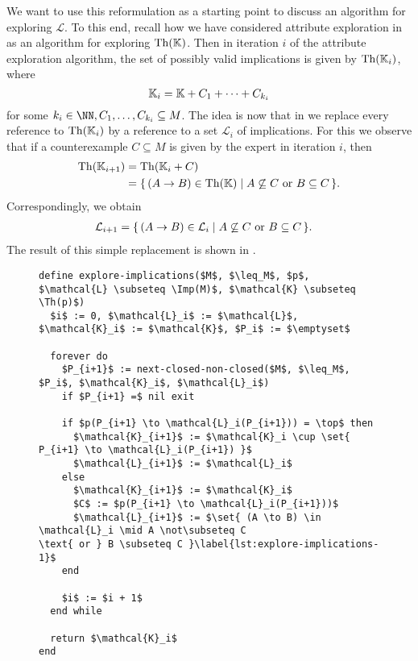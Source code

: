 We want to use this reformulation as a starting point to discuss an algorithm for
exploring $\mathcal{L}$.  To this end, recall how we have considered attribute exploration
in  as an algorithm for exploring $\operatorname{Th}({\mathbb{K}})$.  Then in
iteration $i$ of the attribute exploration algorithm, the set of possibly valid
implications is given by $\operatorname{Th}({\mathbb{K}}_{i})$, where
\begin{equation*}
  {\ensuremath{\mathbb{K}}}_{i} = {\mathbb{K}} + C_{1} + \dots + C_{k_{i}}
\end{equation*}
for some $k_{i} \in \NN, C_{1}, \dots, C_{k_{i}} \subseteq M$.  The idea is now that in
 we replace every reference to
$\operatorname{Th}({\mathbb{K}}_{i})$ by a reference to a set $\mathcal{L}_{i}$ of implications.  For this we
observe that if a counterexample $C \subseteq M$ is given by the expert in iteration $i$,
then
\begin{align*}
  \operatorname{Th}({\mathbb{K}}_{i+1})
  &= \operatorname{Th}({\mathbb{K}}_{i} + C) \\
  &= {\{\, (A \to B) \in \operatorname{Th}({\mathbb{K}}) \mid A \not\subseteq C \text{ or } B \subseteq C \,\}}.
\end{align*}
Correspondingly, we obtain
\begin{align*}
  \mathcal{L}_{i+1}
  &= {\{\, (A \to B) \in \mathcal{L}_{i} \mid A \not\subseteq C \text{ or } B \subseteq C \,\}}.
\end{align*}
The result of this simple replacement is shown in .


\begin{figure}[tp]
  \centering
  \begin{Algorithm}
    \label{alg:explore-implications}
    \hspace*{0cm}
\begin{lstlisting}
define explore-implications($M$, $\leq_M$, $p$, $\mathcal{L} \subseteq \Imp(M)$, $\mathcal{K} \subseteq \Th(p)$)
  $i$ := 0, $\mathcal{L}_i$ := $\mathcal{L}$, $\mathcal{K}_i$ := $\mathcal{K}$, $P_i$ := $\emptyset$

  forever do
    $P_{i+1}$ := next-closed-non-closed($M$, $\leq_M$, $P_i$, $\mathcal{K}_i$, $\mathcal{L}_i$)
    if $P_{i+1} =$ nil exit

    if $p(P_{i+1} \to \mathcal{L}_i(P_{i+1})) = \top$ then
      $\mathcal{K}_{i+1}$ := $\mathcal{K}_i \cup \set{ P_{i+1} \to \mathcal{L}_i(P_{i+1}) }$
      $\mathcal{L}_{i+1}$ := $\mathcal{L}_i$
    else
      $\mathcal{K}_{i+1}$ := $\mathcal{K}_i$
      $C$ := $p(P_{i+1} \to \mathcal{L}_i(P_{i+1}))$
      $\mathcal{L}_{i+1}$ := $\set{ (A \to B) \in \mathcal{L}_i \mid A \not\subseteq C
\text{ or } B \subseteq C }\label{lst:explore-implications-1}$
    end

    $i$ := $i + 1$
  end while

  return $\mathcal{K}_i$  
end
\end{lstlisting}
  \end{Algorithm}
\end{figure}

